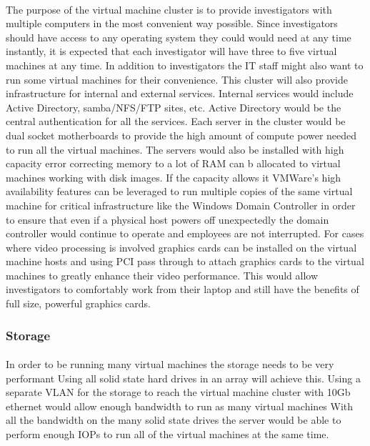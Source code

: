 \documentclass{article}
\begin{document}
\paragraph{}
The purpose of the virtual machine cluster is to provide investigators with multiple computers in the most convenient way possible.
Since investigators should have access to any operating system they could would need at any time instantly, it is expected that each investigator will have three to five virtual machines at any time.
In addition to investigators the IT staff might also want to run some virtual machines for their convenience.
This cluster will also provide infrastructure for internal and external services.
Internal services would include Active Directory, samba/NFS/FTP sites, etc.
Active Directory would be the central authentication for all the services.
Each server in the cluster would be dual socket motherboards to provide the high amount of compute power needed to run all the virtual machines.
The servers would also be installed with high capacity error correcting memory to a lot of RAM can b allocated to virtual machines working with disk images.
If the capacity allows it VMWare's high availability features can be leveraged to run multiple copies of the same virtual machine for critical infrastructure like the Windows Domain Controller in order to ensure that even if a physical host powers off unexpectedly the domain controller would continue to operate and employees are not interrupted.
For cases where video processing is involved graphics cards can be installed on the virtual machine hosts and using PCI pass through to attach graphics cards to the virtual machines to greatly enhance their video performance.
This would allow investigators to comfortably work from their laptop and still have the benefits of full size, powerful graphics cards.

\subsubsection{Storage}
\paragraph{} 
In order to be running many virtual machines the storage needs to be very performant Using all solid state hard drives in an array will achieve this.
Using a separate VLAN for the storage to reach the virtual machine cluster with 10Gb ethernet would allow enough bandwidth to run as many virtual machines 
With all the bandwidth on the many solid state drives the server would be able to perform enough IOPs to run all of the virtual machines at the same time.
\end{document}
